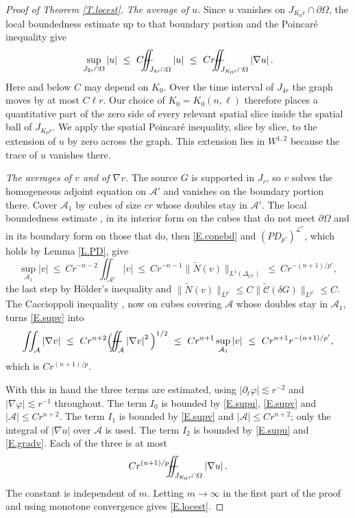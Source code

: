 \documentclass[12pt,leqno]{amsart}
\numberwithin{equation}{section}
\newcommand{\wt}{\widetilde}
\newcommand{\abs}[1]{\left\vert#1\right\vert}
\newcommand{\om}{\Omega}
\newcommand{\pom}{\partial\Omega}
\newcommand{\pd}{\partial}
\newcommand{\LL}{\mathcal L}
\newcommand{\Nt}{\widetilde N}
\def\Yint#1{\mathchoice
	{\YYint\displaystyle\textstyle{#1}}%
	{\YYint\textstyle\scriptstyle{#1}}%
	{\YYint\scriptstyle\scriptscriptstyle{#1}}%
	{\YYint\scriptscriptstyle\scriptscriptstyle{#1}}%
	\!\dint}
\newcommand{\dint}{\int\!\!\!\!\!\int}
\def\YYint#1#2#3{{\setbox0=\hbox{$#1{#2#3}{\iint}$}
		\vcenter{\hbox{$#2#3$}}\kern-.51\wd0}}
\def\longdash{\mkern-1.5mu{-}\mkern-7.5mu{-}}
\def\fiint{\Yint\longdash}
\theoremstyle{plain}
\theoremstyle{remark}
\begin{document}
\begin{proof}[Proof of Theorem \ref{T.locest}]
\noindent\emph{The average of $u$.} Since $u$ vanishes on
$J_{K_0r}\cap\pom$, the
local boundedness estimate up to that boundary portion \cite[Ch.~III]{LSU} and
the Poincar\'e inequality give
\begin{equation}\label{E.supu}
  \sup_{J_{2r}\cap\om}\abs u\ \le\ C\fiint_{J_{4r}\cap\om}\abs u
  \ \le\ Cr\fiint_{J_{K_0r}\cap\om}\abs{\nabla u} .
\end{equation}
Here and below $C$ may depend on $K_0$. Over the time interval of $J_{4r}$ the
graph moves by at most $C\ell r$. Our choice of $K_0=K_0(n,\ell)$ therefore
places a quantitative part of the zero side of every relevant spatial slice
inside the spatial ball of $J_{K_0r}$. We apply the spatial Poincar\'e
inequality, slice by slice, to the extension of $u$ by zero across the graph.
This extension lies in $W^{1,2}$ because the trace of $u$ vanishes there.

\noindent\emph{The averages of $v$ and of $\nabla v$.} The source $G$ is
supported in $J_r$, so $v$ solves the
homogeneous adjoint equation on $\mathcal A'$ and vanishes on the boundary
portion there. Cover $\mathcal A_1$ by cubes of size $cr$ whose doubles stay
in $\mathcal A'$. The local boundedness estimate \cite[Ch.~III]{LSU}, in its
interior form on the cubes that do not meet $\pom$ and in its boundary form on
those that do, then \eqref{E.conebd} and $(PD_{p'})^{\LL^*}$, which holds by
Lemma \ref{L.PD}, give
\begin{equation}\label{E.supv}
  \sup_{\mathcal A_1}\abs v\ \le\ Cr^{-n-2}\iint_{\mathcal A'}\abs v
  \ \le\ Cr^{-n-1}\big\|\Nt(v)\big\|_{L^1(\Delta_{Cr})}
  \ \le\ Cr^{-(n+1)/p'} ,
\end{equation}
the last step by H\"older's inequality and
$\|\Nt(v)\|_{L^{p'}}\le C\|\wt{\mathcal C}(\delta G)\|_{L^{p'}}\le C$. The
Caccioppoli inequality \cite{Ar}, now on cubes covering $\mathcal A$ whose
doubles stay in $\mathcal A_1$, turns \eqref{E.supv} into
\begin{equation}\label{E.gradv}
  \iint_{\mathcal A}\abs{\nabla v}\ \le\ Cr^{n+2}
  \Big(\fiint_{\mathcal A}\abs{\nabla v}^2\Big)^{1/2}
  \ \le\ Cr^{n+1}\sup_{\mathcal A_1}\abs v
  \ \le\ Cr^{n+1}r^{-(n+1)/p'} ,
\end{equation}
which is $Cr^{(n+1)/p}$.\medskip

\noindent With this in hand the three terms are estimated, using
$\abs{\pd_t\varphi}\lesssim r^{-2}$ and $\abs{\nabla\varphi}\lesssim r^{-1}$
throughout. The term $I_0$ is bounded by \eqref{E.supu}, \eqref{E.supv} and
$\abs{\mathcal A}\le Cr^{n+2}$. The term $I_1$ is bounded by \eqref{E.supv} and
$\abs{\mathcal A}\le Cr^{n+2}$; only the integral of $|\nabla u|$ over
$\mathcal A$ is used. The term $I_2$ is bounded by
\eqref{E.supu} and \eqref{E.gradv}. Each of the three is at most
$$Cr^{(n+1)/p}\fiint_{J_{K_0r}\cap\om}\abs{\nabla u}.$$
The constant is independent of $m$. Letting $m\to\infty$ in the first part of
the proof and using monotone convergence gives \eqref{E.locest}.
\end{proof}
\end{document}
